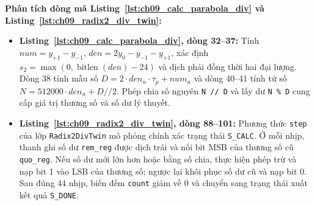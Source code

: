 \textbf{Phân tích dòng mã Listing~\ref{lst:ch09_calc_parabola_div} và Listing~\ref{lst:ch09_radix2_div_twin}:}
\begin{itemize}[leftmargin=1.5em, itemsep=2pt]
    \item \textbf{Listing~\ref{lst:ch09_calc_parabola_div}, dòng 32--37:} Tính $num = y_{+1} - y_{-1}$, $den = 2y_0 - y_{-1} - y_{+1}$, xác định $s_2 = \max(0, \operatorname{bitlen}(den) - 24)$ và dịch phải đồng thời hai đại lượng. Dòng 38 tính mẫu số $D = 2 \cdot den_n \cdot \tau_p + num_n$ và dòng 40--41 tính tử số $N = 512000 \cdot den_n + D // 2$. Phép chia số nguyên \texttt{N // D} và lấy dư \texttt{N \% D} cung cấp giá trị thương số và số dư lý thuyết.
    \item \textbf{Listing~\ref{lst:ch09_radix2_div_twin}, dòng 88--101:} Phương thức \texttt{step} của lớp \texttt{Radix2DivTwin} mô phỏng chính xác trạng thái \texttt{S\_CALC}. Ở mỗi nhịp, thanh ghi số dư \texttt{rem\_reg} được dịch trái và nối bit MSB của thương số cũ \texttt{quo\_reg}. Nếu số dư mới lớn hơn hoặc bằng số chia, thực hiện phép trừ và nạp bit 1 vào LSB của thương số; ngược lại khôi phục số dư cũ và nạp bit 0. Sau đúng $44\text{ nhịp}$, biến đếm \texttt{count} giảm về 0 và chuyển sang trạng thái xuất kết quả \texttt{S\_DONE}.
\end{itemize}


